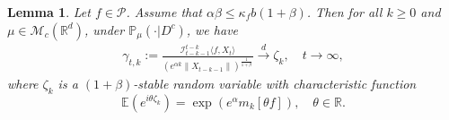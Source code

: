 \documentclass[12pt,a4paper]{amsart}
\theoremstyle{plain}
\newtheorem{lem}[thm]{Lemma}
\theoremstyle{definition}
\numberwithin{equation}{section}
\begin{document}
\begin{lem}\label{lem: mainlemma}
Let $f\in \mathcal{P}$.
Assume that $\alpha\beta\leq \kappa_fb(1+\beta)$.
Then for all $k\geq 0$ and $\mu \in \mathcal M_c(\mathbb R^d)$, under $\mathbb{P}_{\mu}(\cdot | D ^c)$, we have
 \begin{equation}\begin{split}
      \gamma_{t,k}:=\frac{\mathcal I_{t-k-1}^{t-k}\langle f ,X_t\rangle}{(e^{\alpha k}\|X_{t-k-1}\|)^{\frac{1}{1+\beta}}}\xrightarrow{d}\zeta_k, \quad t\rightarrow \infty, \label{limitdistribution1}
 \end{split}\end{equation}
 where $\zeta_k$ is a $(1+\beta)$-stable random variable with characteristic function
 $$\mathbb{E}(e^{i\theta\zeta_k})=\exp(e^{\alpha}m_k[\theta f]),\quad \theta \in \mathbb R.$$
 \end{lem}
\end{document}
